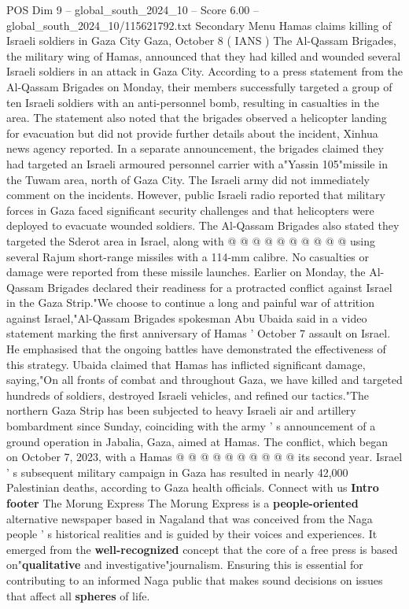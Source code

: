\begin{textsample}{POS Dim 9 – global\_south\_2024\_10 – Score 6.00 – global\_south\_2024\_10/115621792.txt}  \label{ex:f9_pos_088}
Secondary Menu Hamas claims killing of Israeli soldiers in Gaza City Gaza, October 8 ( IANS ) The Al-Qassam Brigades, the military wing of Hamas, announced that they had killed and wounded several Israeli soldiers in an attack in Gaza City.
According to a press statement from the Al-Qassam Brigades on Monday, their members successfully targeted a group of ten Israeli soldiers with an anti-personnel bomb, resulting in casualties in the area.
The statement also noted that the brigades observed a helicopter landing for evacuation but did not provide further details about the incident, Xinhua news agency reported.
In a separate announcement, the brigades claimed they had targeted an Israeli armoured personnel carrier with a"Yassin 105"missile in the Tuwam area, north of Gaza City.
The Israeli army did not immediately comment on the incidents.
However, public Israeli radio reported that military forces in Gaza faced significant security challenges and that helicopters were deployed to evacuate wounded soldiers.
The Al-Qassam Brigades also stated they targeted the Sderot area in Israel, along with @ @ @ @ @ @ @ @ @ @ using several Rajum short-range missiles with a 114-mm calibre.
No casualties or damage were reported from these missile launches.
Earlier on Monday, the Al-Qassam Brigades declared their readiness for a protracted conflict against Israel in the Gaza Strip."We choose to continue a long and painful war of attrition against Israel,"Al-Qassam Brigades spokesman Abu Ubaida said in a video statement marking the first anniversary of Hamas ' October 7 assault on Israel.
He emphasised that the ongoing battles have demonstrated the effectiveness of this strategy.
Ubaida claimed that Hamas has inflicted significant damage, saying,"On all fronts of combat and throughout Gaza, we have killed and targeted hundreds of soldiers, destroyed Israeli vehicles, and refined our tactics."The northern Gaza Strip has been subjected to heavy Israeli air and artillery bombardment since Sunday, coinciding with the army ' s announcement of a ground operation in Jabalia, Gaza, aimed at Hamas.
The conflict, which began on October 7, 2023, with a Hamas @ @ @ @ @ @ @ @ @ @ its second year.
Israel ' s subsequent military campaign in Gaza has resulted in nearly 42,000 Palestinian deaths, according to Gaza health officials.
Connect with us \textbf{Intro} \textbf{footer} The Morung Express The Morung Express is a \textbf{people-oriented} alternative newspaper based in Nagaland that was conceived from the Naga people ' s historical realities and is guided by their voices and experiences.
It emerged from the \textbf{well-recognized} concept that the core of a free press is based on"\textbf{qualitative} and investigative"journalism.
Ensuring this is essential for contributing to an informed Naga public that makes sound decisions on issues that affect all \textbf{spheres} of life.

\end{textsample}
